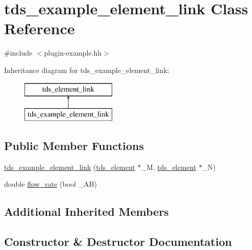 \hypertarget{classtds__example__element__link}{}\section{tds\+\_\+example\+\_\+element\+\_\+link Class Reference}
\label{classtds__example__element__link}


{\ttfamily \#include $<$plugin-\/example.\+hh$>$}

Inheritance diagram for tds\+\_\+example\+\_\+element\+\_\+link\+:\begin{figure}[H]
\begin{center}
\leavevmode
\includegraphics[height=2.000000cm]{classtds__example__element__link}
\end{center}
\end{figure}
\subsection*{Public Member Functions}
\begin{DoxyCompactItemize}
\item 
\hyperlink{classtds__example__element__link_a29ba606b6328d049acc1d099bd60fa13}{tds\+\_\+example\+\_\+element\+\_\+link} (\hyperlink{classtds__element}{tds\+\_\+element} $\ast$\+\_\+M, \hyperlink{classtds__element}{tds\+\_\+element} $\ast$\+\_\+N)
\item 
double \hyperlink{classtds__example__element__link_ab684b4ecbd658f1465a2821a348a51db}{flow\+\_\+rate} (bool \+\_\+\+AB)
\end{DoxyCompactItemize}
\subsection*{Additional Inherited Members}


\subsection{Constructor \& Destructor Documentation}
